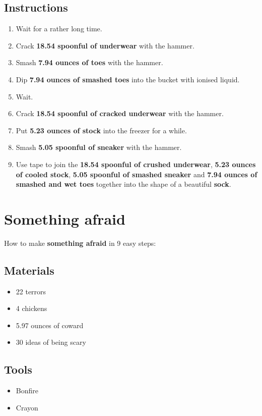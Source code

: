 \documentclass{article}
\begin{document}
\subsection{Instructions}\begin{enumerate}
\item 
Wait for a rather long time.
\item 
Crack \textbf{18.54 spoonful of underwear} with the hammer.
\item 
Smash \textbf{7.94 ounces of toes} with the hammer.
\item 
Dip \textbf{7.94 ounces of smashed toes} into the bucket with ionised liquid.
\item 
Wait.
\item 
Crack \textbf{18.54 spoonful of cracked underwear} with the hammer.
\item 
Put \textbf{5.23 ounces of stock} into the freezer for a while.
\item 
Smash \textbf{5.05 spoonful of sneaker} with the hammer.
\item 
Use tape to join the \textbf{18.54 spoonful of crushed underwear}, \textbf{5.23 ounces of cooled stock}, \textbf{5.05 spoonful of smashed sneaker} and \textbf{7.94 ounces of smashed and wet toes} together into the shape of a beautiful \textbf{sock}.
\end{enumerate}
\newpage
\section{Something afraid}How to make \textbf{something afraid} in 9 easy steps:

\subsection{Materials}\begin{itemize}
\item 
22 terrors
\item 
4 chickens
\item 
5.97 ounces of coward
\item 
30 ideas of being scary
\end{itemize}
\subsection{Tools}\begin{itemize}
\item 
Bonfire
\item 
Crayon
\end{itemize}
\end{document}
